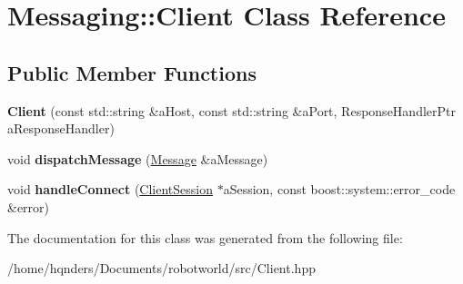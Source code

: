 \hypertarget{class_messaging_1_1_client}{}\section{Messaging\+:\+:Client Class Reference}
\label{class_messaging_1_1_client}
\subsection*{Public Member Functions}
\begin{DoxyCompactItemize}
\item 
{\bfseries Client} (const std\+::string \&a\+Host, const std\+::string \&a\+Port, Response\+Handler\+Ptr a\+Response\+Handler)\hypertarget{class_messaging_1_1_client_a3d9868c2817f181e38f1e50e57faa25f}{}\label{class_messaging_1_1_client_a3d9868c2817f181e38f1e50e57faa25f}

\item 
void {\bfseries dispatch\+Message} (\hyperlink{struct_messaging_1_1_message}{Message} \&a\+Message)\hypertarget{class_messaging_1_1_client_ad591a306de7942562e5f682d4ec3b454}{}\label{class_messaging_1_1_client_ad591a306de7942562e5f682d4ec3b454}

\item 
void {\bfseries handle\+Connect} (\hyperlink{class_messaging_1_1_client_session}{Client\+Session} $\ast$a\+Session, const boost\+::system\+::error\+\_\+code \&error)\hypertarget{class_messaging_1_1_client_a7804792b483e50df149e9e77191d5d16}{}\label{class_messaging_1_1_client_a7804792b483e50df149e9e77191d5d16}

\end{DoxyCompactItemize}


The documentation for this class was generated from the following file\+:\begin{DoxyCompactItemize}
\item 
/home/hqnders/\+Documents/robotworld/src/Client.\+hpp\end{DoxyCompactItemize}
